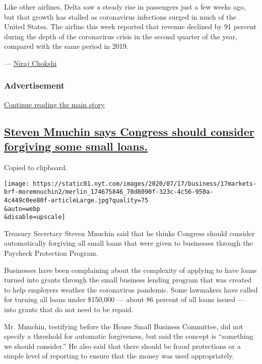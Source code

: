 Like other airlines, Delta saw a steady rise in passengers just a few
weeks ago, but that growth has stalled as coronavirus infections surged
in much of the United States. The airline this week reported that
revenue declined by 91 percent during the depth of the coronavirus
crisis in the second quarter of the year, compared with the same period
in 2019.

--- \href{https://www.nytimes.com/by/niraj-chokshi}{Niraj Chokshi}

\hypertarget{advertisement}{%
\subsubsection{Advertisement}\label{advertisement}}

\protect\hyperlink{after-dfp-ad-mid1}{Continue reading the main story}

\hypertarget{steven-mnuchin-says-congress-should-consider-forgiving-some-small-loans}{%
\subsection{\texorpdfstring{\protect\hyperlink{steven-mnuchin-says-congress-should-consider-forgiving-some-small-loans}{Steven
Mnuchin says Congress should consider forgiving some small
loans.}}{Steven Mnuchin says Congress should consider forgiving some small loans.}}\label{steven-mnuchin-says-congress-should-consider-forgiving-some-small-loans}}

Copied to clipboard.

\texttt{[image: https://static01.nyt.com/images/2020/07/17/business/17markets-brf-moremnuchin2/merlin\_174675846\_70d8090f-323c-4c56-950a-4c449c0ee80f-articleLarge.jpg?quality=75\\\&auto=webp\\\&disable=upscale]}

Treasury Secretary Steven Mnuchin said that he thinks Congress should
consider automatically forgiving all small loans that were given to
businesses through the Paycheck Protection Program.

Businesses have been complaining about the complexity of applying to
have loans turned into grants through the small business lending program
that was created to help employers weather the coronavirus pandemic.
Some lawmakers have called for turning all loans under \$150,000 ---
about 86 percent of all loans issued --- into grants that do not need to
be repaid.

Mr. Mnuchin, testifying before the House Small Business Committee, did
not specify a threshold for automatic forgiveness, but said the concept
is ``something we should consider.'' He also said that there should be
fraud protections or a simple level of reporting to ensure that the
money was used appropriately.

